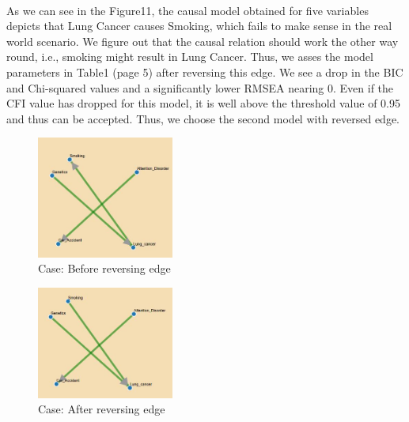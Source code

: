 \documentclass{vgtc}                          %
\begin{document}
\paragraph{}
As we can see in the Figure11, the causal model obtained for five variables depicts that Lung Cancer causes Smoking, which fails to make sense in the real world scenario. We figure out that the causal relation should work the other way round, i.e., smoking might result in Lung Cancer. Thus, we asses the model parameters in Table1 (page 5) after reversing this edge. We see a drop in the BIC and Chi-squared values and a significantly lower RMSEA nearing 0. Even if the CFI value has dropped for this model, it is well above the threshold value of 0.95 and thus can be accepted. Thus, we choose the second model with reversed edge.
\begin{figure}[H]
  \caption{Case: Before reversing edge}
  \centering
  \includegraphics[width=0.4\textwidth]{c4_1}
\end{figure}

\begin{figure}[H]
  \caption{Case: After reversing edge}
  \centering
  \includegraphics[width=0.4\textwidth]{c4_2}
\end{figure}
\end{document}
